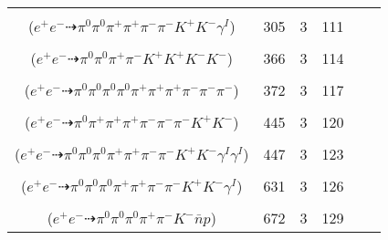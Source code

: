 \documentclass[landscape]{article}
\newcounter{rownumbers}
\newcommand\rn{\stepcounter{rownumbers}\arabic{rownumbers}}
\newcommand{\EOL}{\\} %
\newcommand{\topoTags}[1]{#1} %
\begin{document}
\begin{longtable}{clcccc}
\rn & \makecell[l]{ $ 
e^{+} e^{-} \rightarrow \pi^{0} \rho^{0} \pi^{-} \rho^{+} K^{+} K^{-} \gamma^{I} ,
\rho^{0} \rightarrow \pi^{+} \pi^{-} ,
\rho^{+} \rightarrow \pi^{0} \pi^{+} 
$ \\ ($
e^{+} e^{-} \dashrightarrow \pi^{0} \pi^{0} \pi^{+} \pi^{+} \pi^{-} \pi^{-} K^{+} K^{-} \gamma^{I} 
$) } & \topoTags{305 & }3 & 111 \EOL

\rn & \makecell[l]{ $ 
e^{+} e^{-} \rightarrow \pi^{0} \pi^{+} \pi^{-} K^{+} K^{+} K^{-} K^{*-} ,
K^{*-} \rightarrow \pi^{0} K^{-} 
$ \\ ($
e^{+} e^{-} \dashrightarrow \pi^{0} \pi^{0} \pi^{+} \pi^{-} K^{+} K^{+} K^{-} K^{-} 
$) } & \topoTags{366 & }3 & 114 \EOL

\rn & \makecell[l]{ $ 
e^{+} e^{-} \rightarrow \pi^{0} \pi^{+} \pi^{-} \rho^{+} \rho^{-} \omega ,
\rho^{+} \rightarrow \pi^{0} \pi^{+} ,
\rho^{-} \rightarrow \pi^{0} \pi^{-} ,
\omega \rightarrow \pi^{0} \pi^{+} \pi^{-} 
$ \\ ($
e^{+} e^{-} \dashrightarrow \pi^{0} \pi^{0} \pi^{0} \pi^{0} \pi^{+} \pi^{+} \pi^{+} \pi^{-} \pi^{-} \pi^{-} 
$) } & \topoTags{372 & }3 & 117 \EOL

\rn & \makecell[l]{ $ 
e^{+} e^{-} \rightarrow \rho^{0} \pi^{+} \pi^{+} \pi^{-} \rho^{-} K^{+} K^{-} ,
\rho^{0} \rightarrow \pi^{+} \pi^{-} ,
\rho^{-} \rightarrow \pi^{0} \pi^{-} 
$ \\ ($
e^{+} e^{-} \dashrightarrow \pi^{0} \pi^{+} \pi^{+} \pi^{+} \pi^{-} \pi^{-} \pi^{-} K^{+} K^{-} 
$) } & \topoTags{445 & }3 & 120 \EOL

\rn & \makecell[l]{ $ 
e^{+} e^{-} \rightarrow \pi^{0} \pi^{0} \pi^{+} \pi^{-} \rho^{+} K^{*} K^{-} \gamma^{I} \gamma^{I} ,
\rho^{+} \rightarrow \pi^{0} \pi^{+} ,
K^{*} \rightarrow \pi^{-} K^{+} 
$ \\ ($
e^{+} e^{-} \dashrightarrow \pi^{0} \pi^{0} \pi^{0} \pi^{+} \pi^{+} \pi^{-} \pi^{-} K^{+} K^{-} \gamma^{I} \gamma^{I} 
$) } & \topoTags{447 & }3 & 123 \EOL

\rn & \makecell[l]{ $ 
e^{+} e^{-} \rightarrow \pi^{0} \rho^{0} \pi^{+} \rho^{-} K^{-} K^{*+} \gamma^{I} ,
\rho^{0} \rightarrow \pi^{+} \pi^{-} ,
\rho^{-} \rightarrow \pi^{0} \pi^{-} ,
K^{*+} \rightarrow \pi^{0} K^{+} 
$ \\ ($
e^{+} e^{-} \dashrightarrow \pi^{0} \pi^{0} \pi^{0} \pi^{+} \pi^{+} \pi^{-} \pi^{-} K^{+} K^{-} \gamma^{I} 
$) } & \topoTags{631 & }3 & 126 \EOL

\rn & \makecell[l]{ $ 
e^{+} e^{-} \rightarrow \pi^{0} \pi^{-} \rho^{+} K^{-} p \bar{\Lambda} ,
\rho^{+} \rightarrow \pi^{0} \pi^{+} ,
\bar{\Lambda} \rightarrow \pi^{0} \bar{n} 
$ \\ ($
e^{+} e^{-} \dashrightarrow \pi^{0} \pi^{0} \pi^{0} \pi^{+} \pi^{-} K^{-} \bar{n} p 
$) } & \topoTags{672 & }3 & 129 \EOL


\end{longtable}
\end{document}
